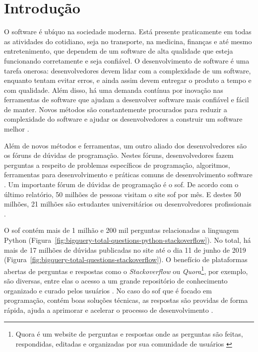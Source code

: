 \chapter{Introdução}
\label{cap:introducao}

O software é ubíquo na sociedade moderna. Está presente praticamente em todas as atividades do cotidiano, seja no transporte, na medicina, finanças e até mesmo entretenimento, que dependem de um software de alta qualidade que esteja funcionando corretamente e seja confiável. O desenvolvimento de software é uma tarefa onerosa: desenvolvedores devem lidar com a complexidade de um software, enquanto tentam evitar erros, e ainda assim devem entregar o produto a tempo e com qualidade. Além disso, há uma demanda contínua por inovação nas ferramentas de software que ajudam a desenvolver software mais confiável e fácil de manter. Novos métodos são constantemente procurados para reduzir a complexidade do software e ajudar os desenvolvedores a construir um software melhor \citep{Allamanis:2018:SML}.

Além de novos métodos e ferramentas, um outro aliado dos desenvolvedores são os fóruns de dúvidas de programação. Nestes fóruns, desenvolvedores fazem perguntas a respeito de problemas específicos de programação, algoritmos, ferramentas para desenvolvimento e práticas comuns de desenvolvimento software \citep{stackoverflow-questions-topics-2019}. Um importante fórum de dúvidas de programação é o \Gls{sof}. De acordo com o último relatório, 50 milhões de pessoas visitam o site \Gls{sof} por mês. E destes 50 milhões, 21 milhões são estudantes universitários ou desenvolvedores profissionais \citep{stackoverflow-survey-2019}.

O \Gls{sof} contém mais de 1 milhão e 200 mil perguntas relacionadas a linguagem Python (Figura~\ref{fig:bigquery-total-questions-python-stackoverflow}). No total, há mais de 17 milhões de dúvidas publicadas no site até o dia 11 de junho de 2019 (Figura~\ref{fig:bigquery-total-questions-stackoverflow}). O benefício de plataformas abertas de perguntas e respostas como o \textit{Stackoverflow} ou \textit{Quora}\footnote{Quora é um website de perguntas e respostas onde as perguntas são feitas, respondidas, editadas e organizadas por sua comunidade de usuários \citep{wikipedia-quora-2019}}, por exemplo,  são diversas, entre elas o acesso a um grande repositório de conhecimento organizado e curado pelos usuários \citep{Wang-quora:2013}. No caso do \Gls{sof} que é focado em programação, contém boas soluções técnicas, as respostas são providas de forma rápida, ajuda a aprimorar e acelerar o processo de desenvolvimento \citep{Vasilescu:2013}.

